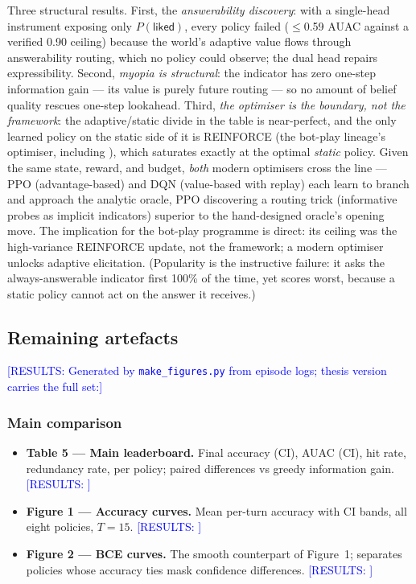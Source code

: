 \documentclass[11pt]{article}
\newcommand{\results}[1]{\textcolor{blue}{[RESULTS: #1]}}
\begin{document}
Three structural results. First, the \emph{answerability discovery}: with
a single-head instrument exposing only $P(\textsf{liked})$, every policy
failed ($\leq$0.59 AUAC against a verified 0.90 ceiling) because the
world's adaptive value flows through answerability routing, which no
policy could observe; the dual head repairs expressibility.
Second, \emph{myopia is structural}: the indicator has zero one-step
information gain --- its value is purely future routing --- so no amount
of belief quality rescues one-step lookahead. Third, \emph{the optimiser
is the boundary, not the framework}: the adaptive/static divide in the
table is near-perfect, and the only learned policy on the static side of
it is REINFORCE (the bot-play lineage's optimiser, including
\citealp{das2017learning, makarova2024learning}), which saturates exactly
at the optimal \emph{static} policy. Given the same state, reward, and
budget, \emph{both} modern optimisers cross the line --- PPO
(advantage-based) and DQN (value-based with replay) each learn to branch
and approach the analytic oracle, PPO discovering a routing trick
(informative probes as implicit indicators) superior to the hand-designed
oracle's opening move. The implication for the bot-play programme is
direct: its ceiling was the high-variance REINFORCE update, not the
framework; a modern optimiser unlocks adaptive elicitation. (Popularity is
the instructive failure: it asks the always-answerable indicator first
100\% of the time, yet scores worst, because a static policy cannot act on
the answer it receives.)

\subsection{Remaining artefacts}

\results{Generated by \texttt{make\_figures.py} from episode logs; thesis
version carries the full set:}

\subsubsection*{Main comparison}
\begin{itemize}
  \item \textbf{Table 5 --- Main leaderboard.} Final accuracy (CI), AUAC
  (CI), hit rate, redundancy rate, per policy; paired differences vs
  greedy information gain. \results{}
  \item \textbf{Figure 1 --- Accuracy curves.} Mean per-turn accuracy with
  CI bands, all eight policies, $T = 15$. \results{}
  \item \textbf{Figure 2 --- BCE curves.} The smooth counterpart of
  Figure~1; separates policies whose accuracy ties mask confidence
  differences. \results{}
\end{itemize}
\end{document}
